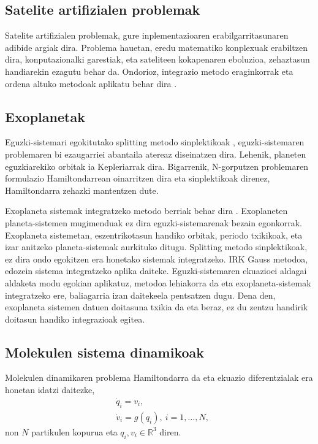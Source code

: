 \subsection*{Satelite artifizialen problemak}
    
Satelite artifizialen problemak, gure inplementazioaren erabilgarritasunaren adibide argiak dira. Problema hauetan, eredu matematiko konplexuak erabiltzen dira, konputazionalki garestiak, eta sateliteen kokapenaren eboluzioa, zehaztasun handiarekin ezagutu behar da. Ondorioz, integrazio metodo eraginkorrak eta  ordena altuko metodoak aplikatu behar dira \cite{Beylkin2014}.    

\subsection*{Exoplanetak}

Eguzki-sistemari egokitutako splitting metodo sinplektikoak \cite{Wisdom1991,Laskar2001}, eguzki-sistemaren problemaren bi ezaugarriei abantaila atereaz diseinatzen dira. Lehenik, planeten eguzkiarekiko orbitak ia Kepleriarrak dira. Bigarrenik, N-gorputzen problemaren formulazio Hamiltondarrean oinarritzen dira eta sinplektikoak direnez, Hamiltondarra zehazki mantentzen dute. 

Exoplaneta sistemak integratzeko metodo berriak behar dira \cite{Fabrycky2010}. Exoplaneten planeta-sistemen mugimenduak ez dira eguzki-sistemarenak bezain egonkorrak. Exoplaneta sistemetan, eszentrikotasun handiko orbitak, periodo txikikoak, eta izar anitzeko planeta-sistemak aurkituko ditugu. Splitting metodo sinplektikoak, ez dira ondo egokitzen era honetako sistemak integratzeko.
IRK Gauss metodoa, edozein sistema integratzeko aplika daiteke. Eguzki-sistemaren ekuazioei aldagai aldaketa modu egokian aplikatuz, metodoa lehiakorra da eta exoplaneta-sistemak integratzeko ere,  baliagarria izan daitekeela pentsatzen dugu. Dena den, exoplaneta sistemen datuen doitasuna txikia da  eta beraz, ez du zentzu handirik doitasun handiko integrazioak egitea.         
 
\subsection*{Molekulen sistema dinamikoak}

Molekulen dinamikaren problema Hamiltondarra da eta ekuazio diferentzialak era honetan idatzi daitezke,
\begin{align*}
&\dot{q}_i=v_i, \\
&\dot{v}_i=g(q_i), \ i=1,\dots,N,
\end{align*}
non $N$ partikulen kopurua eta $q_i,v_i \in \mathbb{R}^3$ diren.


